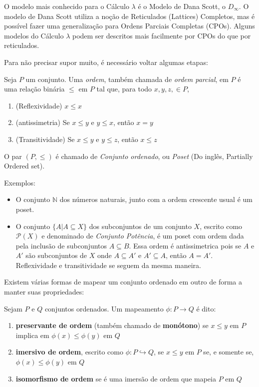 \documentclass[../main.tex]{subfiles}
\begin{document}
O modelo mais conhecido para o Cálculo $\lambda$ é o Modelo de Dana Scott, o $D_{\infty}$. O modelo de Dana Scott utiliza a noção de Reticulados (Lattices) Completos, mas é possível fazer uma generalização para Ordens Parciais Completas (CPOs). Alguns modelos do Cálculo $\lambda$ podem ser descritos mais facilmente por CPOs do que por reticulados. 

Para não precisar supor muito, é necessário voltar algumas etapas:


\begin{definition}
    Seja $P$ um conjunto. Uma \emph{ordem}, também chamada de \emph{ordem parcial}, em $P$ é uma relação binária $\leq$ em $P$ tal que, para todo $x, y, z, \in P$,
    \begin{enumerate}
        \item (Reflexividade) $x \leq x$
        \item (antissimetria) Se $x \leq y$ e $y \leq x$, então $x = y$
        \item (Transitividade) Se $x \leq y$ e $y \leq z$, então $x \leq z$
    \end{enumerate}
\end{definition}

O par $(P, \leq)$ é chamado de \emph{Conjunto ordenado}, ou \emph{Poset} (Do inglês, Partially Ordered set).

Exemplos:
\begin{itemize}
    \item O conjunto $\mathbb{N}$ dos números naturais, junto com a ordem crescente usual é um poset.
    \item O conjunto $\{ A | A \subseteq X\}$ dos subconjuntos de um conjunto $X$, escrito como $\mathcal{P}(X)$ e denominado de \emph{Conjunto Potência}, é um poset com ordem dada pela inclusão de subconjuntos $A \subseteq B$. Essa ordem é antissimetrica pois se $A$ e $A'$ são subconjuntos de $X$ onde $A \subseteq A'$ e $A' \subseteq A$, então $A = A'$. Reflexividade e transitividade se seguem da mesma maneira.
\end{itemize}

Existem várias formas de mapear um conjunto ordenado em outro de forma a manter suas propriedades:

\begin{definition}
    Sejam $P$ e $Q$ conjuntos ordenados. Um mapeamento $\phi : P \to Q$ é dito:
    \begin{enumerate}
        \item \textbf{preservante de ordem} (também chamado de \textbf{monótono}) se $x \leq y$ em $P$ implica em $\phi (x) \leq \phi (y)$ em $Q$
        \item \textbf{imersivo de ordem}, escrito como $\phi : P \hookrightarrow Q$, se $x \leq y$ em $P$ se, e somente se, $\phi (x) \leq \phi (y)$ em $Q$
        \item \textbf{isomorfismo de ordem} se é uma imersão de ordem que mapeia $P$ em $Q$
    \end{enumerate}
\end{definition}
\end{document}
